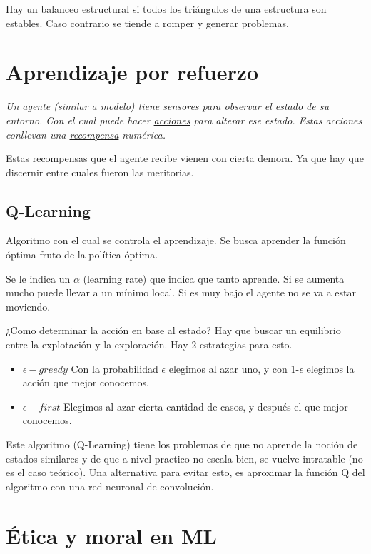 \documentclass[titlepage,a4paper]{article}
\begin{document}
Hay un balanceo estructural si todos los triángulos de una estructura son estables. Caso contrario se tiende a romper y generar problemas.

\newpage

\section{Aprendizaje por refuerzo}
\textit{
Un \underline{agente} (similar a modelo) tiene sensores para observar el \underline{estado} de su entorno. Con el cual puede hacer \underline{acciones} para alterar ese estado. Estas acciones conllevan una \underline{recompensa} numérica.
}


Estas recompensas que el agente recibe vienen con cierta demora. Ya que hay que discernir entre cuales fueron las meritorias.


\subsection{Q-Learning}
Algoritmo con el cual se controla el aprendizaje. Se busca aprender la función óptima fruto de la política óptima.

Se le indica un $\alpha$ (learning rate) que indica que tanto aprende. Si se aumenta mucho puede llevar a un mínimo local. Si es muy bajo el agente no se va a estar moviendo.

¿Como determinar la acción en base al estado? Hay que buscar un equilibrio entre la explotación y la exploración. Hay 2 estrategias para esto.

\begin{itemize} %
    \item $\epsilon-greedy$ Con la probabilidad $\epsilon$ elegimos al azar uno, y con 1-$\epsilon$ elegimos la acción que mejor conocemos.
    \item $\epsilon-first$ Elegimos al azar cierta cantidad de casos, y después el que mejor conocemos. 
\end{itemize}

Este algoritmo (Q-Learning) tiene los problemas de que no aprende la noción de estados similares y de que a nivel practico no escala bien, se vuelve intratable (no es el caso teórico). Una alternativa para evitar esto, es aproximar la función Q del algoritmo con una red neuronal de convolución.

\newpage

\section{Ética y moral en ML}
\end{document}
